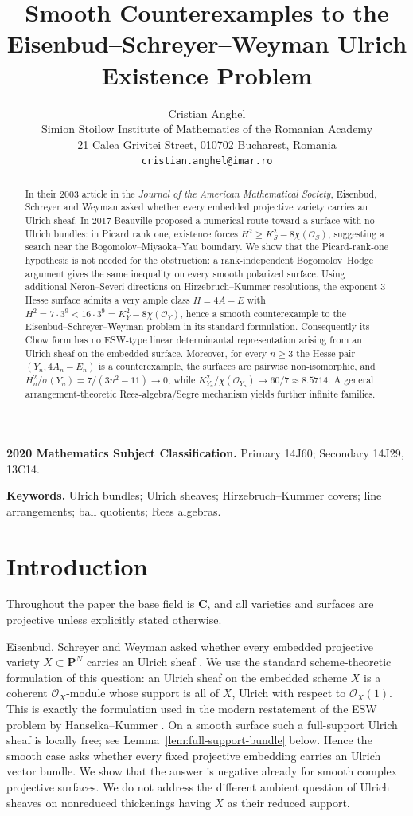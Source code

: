 \documentclass[11pt]{article}
\title{Smooth Counterexamples to the Eisenbud--Schreyer--Weyman Ulrich Existence Problem}
\author{Cristian Anghel\\
\small Simion Stoilow Institute of Mathematics of the Romanian Academy\\
\small 21 Calea Grivitei Street, 010702 Bucharest, Romania\\
\small \texttt{cristian.anghel@imar.ro}}
\date{}
\newcommand{\PP}{\mathbf P}
\newcommand{\CC}{\mathbf C}
\newcommand{\OO}{\mathcal O}
\newcommand{\sig}{\sigma}
\begin{document}
\maketitle

\begin{abstract}
In their 2003 article in the \emph{Journal of the American Mathematical Society},
Eisenbud, Schreyer and Weyman asked whether every embedded projective variety carries
an Ulrich sheaf.  In 2017 Beauville proposed a numerical route toward a surface with no
Ulrich bundles: in Picard rank one, existence forces
$H^2\ge K_S^2-8\chi(\OO_S)$, suggesting a search near the
Bogomolov--Miyaoka--Yau boundary.  We show that the Picard-rank-one hypothesis is not
needed for the obstruction: a rank-independent Bogomolov--Hodge argument gives the
same inequality on every smooth polarized surface.  Using additional
N\'eron--Severi directions on Hirzebruch--Kummer resolutions, the exponent-$3$ Hesse
surface admits a very ample class $H=4A-E$ with
$H^2=7\cdot3^9<16\cdot3^9=K_Y^2-8\chi(\OO_Y)$, hence a smooth counterexample to
the Eisenbud--Schreyer--Weyman problem in its standard formulation.  Consequently its Chow form has no
ESW-type linear determinantal representation arising from an Ulrich sheaf on the embedded surface.  Moreover,
for every $n\ge3$ the Hesse pair $(Y_n,4A_n-E_n)$ is a counterexample, the surfaces are
pairwise non-isomorphic, and $H_n^2/\sig(Y_n)=7/(3n^2-11)\to0$, while
$K_{Y_n}^2/\chi(\OO_{Y_n})\to60/7\approx8.5714$.  A general
arrangement-theoretic Rees-algebra/Segre mechanism yields further infinite families.
\end{abstract}

\medskip
\noindent\textbf{2020 Mathematics Subject Classification.}
Primary 14J60; Secondary 14J29, 13C14.

\noindent\textbf{Keywords.}
Ulrich bundles; Ulrich sheaves; Hirzebruch--Kummer covers; line arrangements;
ball quotients; Rees algebras.

\section{Introduction}

Throughout the paper the base field is $\CC$, and all varieties and surfaces are
projective unless explicitly stated otherwise.

Eisenbud, Schreyer and Weyman asked whether every embedded projective variety
$X\subset\PP^N$ carries an Ulrich sheaf \cite[p.~543]{ESW}.  We use the standard
scheme-theoretic formulation of this question: an Ulrich sheaf on the embedded
scheme $X$ is a coherent $\OO_X$-module whose support is all of $X$, Ulrich with
respect to $\OO_X(1)$.  This is exactly the formulation used in the modern
restatement of the ESW problem by Hanselka--Kummer
\cite[Proposition~4.2 and Problem~4.3]{HanselkaKummer}.  On a smooth surface such
a full-support Ulrich sheaf is locally free; see Lemma~\ref{lem:full-support-bundle}
below.  Hence the smooth case asks whether every fixed projective embedding carries
an Ulrich vector bundle.  We show that the answer is negative already for smooth
complex projective surfaces.  We do not address the different ambient question of
Ulrich sheaves on nonreduced thickenings having $X$ as their reduced support.
\end{document}
